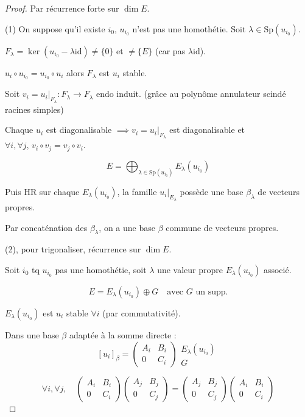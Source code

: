 \begin{proof}
    Par récurrence forte sur $\dim E$.
    
    (1) On suppose qu'il existe $i_0$, $u_{i_0}$ n'est pas une homothétie.
    Soit $\lambda \in \text{Sp}(u_{i_0})$.
    
    $F_\lambda = \ker(u_{i_0} - \lambda \text{id}) \neq \{0\}$ et $\neq \{E\}$ (car pas $\lambda \text{id}$).
    
    $u_i \circ u_{i_0} = u_{i_0} \circ u_i$ alors $F_\lambda$ est $u_i$ stable.
    
    Soit $v_i = u_i|_{F_\lambda} : F_\lambda \to F_\lambda$ endo induit.
    (grâce au polynôme annulateur scindé racines simples)
    
    Chaque $u_i$ est diagonalisable $\implies v_i = u_i|_{F_\lambda}$ est diagonalisable 
    et $\forall i, \forall j, \, v_i \circ v_j = v_j \circ v_i$.
    
    \[ E = \bigoplus_{\lambda \in \text{Sp}(u_{i_0})} E_\lambda(u_{i_0}) \]
    
    Puis HR sur chaque $E_\lambda(u_{i_0})$, la famille $u_i|_{E_\lambda}$ possède une base $\beta_\lambda$ de vecteurs propres.
    
    Par concaténation des $\beta_\lambda$, on a une base $\beta$ commune de vecteurs propres.
    
    \lvspace
    (2), pour trigonaliser, récurrence sur $\dim E$.
    
    Soit $i_0$ tq $u_{i_0}$ pas une homothétie, soit $\lambda$ une valeur propre $E_\lambda(u_{i_0})$ associé.

\[ E = E_\lambda(u_{i_0}) \oplus G \quad \text{avec } G \text{ un supp.} \]

$E_\lambda(u_{i_0})$ est $u_i$ stable $\forall i$ (par commutativité).

Dans une base $\beta$ adaptée à la somme directe : 
\[ [u_i]_\beta = \begin{pmatrix} A_i & B_i \\ 0 & C_i \end{pmatrix} \begin{matrix} E_\lambda(u_{i_0}) \\ G \end{matrix} \]

\[ \forall i, \forall j, \quad \begin{pmatrix} A_i & B_i \\ 0 & C_i \end{pmatrix} \begin{pmatrix} A_j & B_j \\ 0 & C_j \end{pmatrix} = \begin{pmatrix} A_j & B_j \\ 0 & C_j \end{pmatrix} \begin{pmatrix} A_i & B_i \\ 0 & C_i \end{pmatrix} \]


\end{proof}
